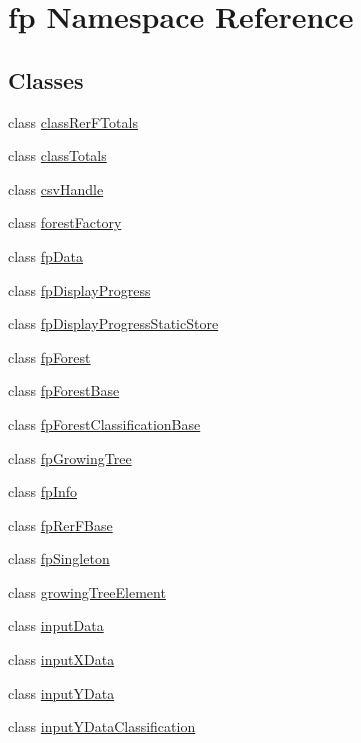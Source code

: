 \hypertarget{namespacefp}{}\section{fp Namespace Reference}
\label{namespacefp}
\subsection*{Classes}
\begin{DoxyCompactItemize}
\item 
class \hyperlink{classfp_1_1classRerFTotals}{class\+Rer\+F\+Totals}
\item 
class \hyperlink{classfp_1_1classTotals}{class\+Totals}
\item 
class \hyperlink{classfp_1_1csvHandle}{csv\+Handle}
\item 
class \hyperlink{classfp_1_1forestFactory}{forest\+Factory}
\item 
class \hyperlink{classfp_1_1fpData}{fp\+Data}
\item 
class \hyperlink{classfp_1_1fpDisplayProgress}{fp\+Display\+Progress}
\item 
class \hyperlink{classfp_1_1fpDisplayProgressStaticStore}{fp\+Display\+Progress\+Static\+Store}
\item 
class \hyperlink{classfp_1_1fpForest}{fp\+Forest}
\item 
class \hyperlink{classfp_1_1fpForestBase}{fp\+Forest\+Base}
\item 
class \hyperlink{classfp_1_1fpForestClassificationBase}{fp\+Forest\+Classification\+Base}
\item 
class \hyperlink{classfp_1_1fpGrowingTree}{fp\+Growing\+Tree}
\item 
class \hyperlink{classfp_1_1fpInfo}{fp\+Info}
\item 
class \hyperlink{classfp_1_1fpRerFBase}{fp\+Rer\+F\+Base}
\item 
class \hyperlink{classfp_1_1fpSingleton}{fp\+Singleton}
\item 
class \hyperlink{classfp_1_1growingTreeElement}{growing\+Tree\+Element}
\item 
class \hyperlink{classfp_1_1inputData}{input\+Data}
\item 
class \hyperlink{classfp_1_1inputXData}{input\+X\+Data}
\item 
class \hyperlink{classfp_1_1inputYData}{input\+Y\+Data}
\item 
class \hyperlink{classfp_1_1inputYDataClassification}{input\+Y\+Data\+Classification}
\item 

\end{DoxyCompactItemize}
